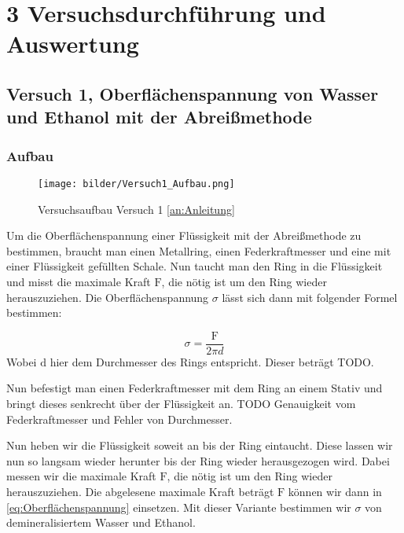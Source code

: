 \chapter*{3 Versuchsdurchführung und Auswertung}
\setcounter{chapter}{3}
\setcounter{section}{0}
\setcounter{subsection}{0}

        
 
        \section{Versuch 1, Oberflächenspannung von Wasser und Ethanol mit der Abreißmethode}
        \label{sec:Versuch1}

        \subsection{Aufbau}

        \begin{figure}[H]
            \centering
            \texttt{[image: bilder/Versuch1\_Aufbau.png]}
            \caption{Versuchsaufbau Versuch 1 \ref{an:Anleitung}}
            \label{fig:Versuch1_Aufbau}
        \end{figure}

        Um die Oberflächenspannung einer Flüssigkeit mit der Abreißmethode zu bestimmen,
        braucht man einen Metallring, einen Federkraftmesser und eine mit einer Flüssigkeit gefüllten Schale. Nun taucht man den Ring in die Flüssigkeit und misst die maximale Kraft $\mathrm{F}$, die nötig ist um den Ring wieder herauszuziehen. Die Oberflächenspannung $\sigma$ lässt sich dann mit folgender Formel bestimmen:

        \begin{equation}
            \sigma = \frac{\mathrm{F}}{2\pi d}
            \label{eq:Oberflächenspannung}
        \end{equation}
        Wobei $\mathrm{d}$ hier dem Durchmesser des Rings entspricht. Dieser beträgt TODO.
        
        Nun befestigt man einen Federkraftmesser mit dem Ring an einem Stativ und bringt dieses senkrecht über der Flüssigkeit an. TODO Genauigkeit vom Federkraftmesser und Fehler von Durchmesser. 

        \noindent Nun heben wir die Flüssigkeit soweit an bis der Ring eintaucht. Diese lassen wir nun so langsam wieder herunter bis der Ring wieder herausgezogen wird. Dabei messen wir die maximale Kraft $\mathrm{F}$, die nötig ist um den Ring wieder herauszuziehen. Die abgelesene maximale Kraft beträgt $\mathrm{F}$ können wir dann in \ref{eq:Oberflächenspannung} einsetzen. Mit dieser Variante bestimmen wir $\sigma$ von demineralisiertem Wasser und Ethanol.
